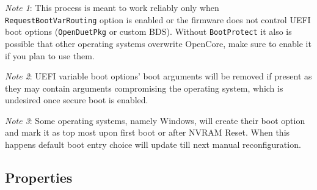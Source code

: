 \documentclass[]{article}
\begin{document}
\emph{Note 1}: This process is meant to work reliably only when \texttt{RequestBootVarRouting}
option is enabled or the firmware does not control UEFI boot options (\texttt{OpenDuetPkg} or
custom BDS). Without \texttt{BootProtect} it also is possible that other operating systems
overwrite OpenCore, make sure to enable it if you plan to use them.

\emph{Note 2}: UEFI variable boot options' boot arguments will be removed if present as they
may contain arguments compromising the operating system, which is undesired once secure boot
is enabled.

\emph{Note 3}: Some operating systems, namely Windows, will create their boot option and
mark it as top most upon first boot or after NVRAM Reset. When this happens default boot
entry choice will update till next manual reconfiguration.

\subsection{Properties}\label{miscprops}
\end{document}
